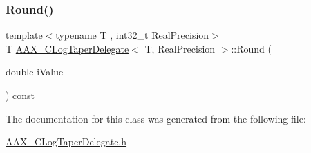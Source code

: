 \subsubsection{\texorpdfstring{Round()}{Round()}}
{\footnotesize\ttfamily template$<$typename T , int32\+\_\+t Real\+Precision$>$ \\
T \mbox{\hyperlink{a01497}{A\+A\+X\+\_\+\+C\+Log\+Taper\+Delegate}}$<$ T, Real\+Precision $>$\+::Round (\begin{DoxyParamCaption}\item[{double}]{i\+Value }\end{DoxyParamCaption}) const\hspace{0.3cm}{\ttfamily [protected]}}



The documentation for this class was generated from the following file\+:\begin{DoxyCompactItemize}
\item 
\mbox{\hyperlink{a00440}{A\+A\+X\+\_\+\+C\+Log\+Taper\+Delegate.\+h}}\end{DoxyCompactItemize}
